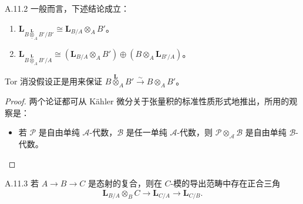 \begin{rem}{A.11.2}\label{thm:a6-07-21}
一般而言，下述结论成立：
\begin{enumerate}[(1)]
\item $\mathbf L_{B\overset{\mathbf L}{\underline{\otimes}}_AB'/B'}\cong\mathbf L_{B/A}\otimes_A B'$。
\item $\mathbf L_{B\overset{\mathbf L}{\underline{\otimes}}_AB'/A}\cong(\mathbf L_{B/A}\otimes_A B')\oplus(B\otimes_A\mathbf L_{B'/A})$。
\end{enumerate}
Tor 消没假设正是用来保证 $B\overset{\mathbf L}{\otimes}_AB'\xrightarrow{\sim}B\otimes_A B'$。
\end{rem}

\begin{proof}
两个论证都可从 Kähler 微分关于张量积的标准性质形式地推出，所用的观察是：
\begin{itemize}
\item 若 $\mathcal P$ 是自由单纯 $\mathcal A$-代数，$\mathcal B$ 是任一单纯 $\mathcal A$-代数，则 $\mathcal P\otimes_{\mathcal A}\mathcal B$ 是自由单纯 $\mathcal B$-代数。
\end{itemize}
\end{proof}

\begin{prop}{A.11.3}\label{thm:a6-07-22}
若 $A\to B\to C$ 是态射的复合，则在 $C$-模的导出范畴中存在正合三角
\[
\mathbf L_{B/A}\otimes_B C\to\mathbf L_{C/A}\to\mathbf L_{C/B}.
\]
\end{prop}

